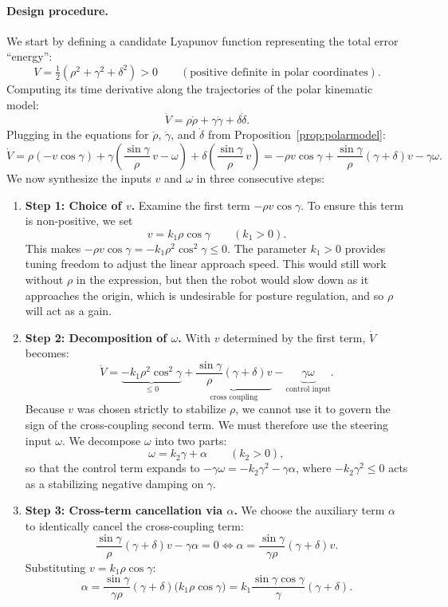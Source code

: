 \documentclass[11pt,a4paper]{article}
\theoremstyle{definition}
\theoremstyle{plain}
\theoremstyle{remark}
\begin{document}
\paragraph{Design procedure.}
We start by defining a candidate Lyapunov function representing the total error ``energy'':
\[
V = \tfrac{1}{2}\left(\rho^2 + \gamma^2 + \delta^2\right) > 0\qquad (\text{positive definite in polar coordinates}).
\]
Computing its time derivative along the trajectories of the polar kinematic model:
\[
\dot V = \rho\dot\rho + \gamma\dot\gamma + \delta\dot\delta .
\]
Plugging in the equations for $\dot\rho$, $\dot\gamma$, and $\dot\delta$ from Proposition~\ref{prop:polarmodel}:
\[
\dot V = \rho(-v\cos\gamma) + \gamma\left(\frac{\sin\gamma}{\rho}\,v - \omega\right) + \delta\left(\frac{\sin\gamma}{\rho}\,v\right)
= -\rho v\cos\gamma + \frac{\sin\gamma}{\rho}(\gamma+\delta)v - \gamma\omega .
\]
We now synthesize the inputs $v$ and $\omega$ in three consecutive steps:
\begin{enumerate}[leftmargin=*]
\item \textbf{Step 1: Choice of $v$.}
Examine the first term $-\rho v\cos\gamma$. To ensure this term is non-positive, we set
\[
v = k_1\rho\cos\gamma\qquad (k_1>0).
\]
This makes $-\rho v\cos\gamma = -k_1\rho^2\cos^2\gamma \le 0$. The parameter $k_1>0$ provides tuning freedom to adjust the linear approach speed. This would still work without $\rho$ in the expression, but then the robot would slow down as it approaches the origin, which is undesirable for posture regulation, and so $\rho$ will act as a gain.

\item \textbf{Step 2: Decomposition of $\omega$.}
With $v$ determined by the first term, $\dot V$ becomes:
\[
\dot V = \underbrace{-k_1\rho^2\cos^2\gamma}_{\le 0} + \underbrace{\frac{\sin\gamma}{\rho}(\gamma+\delta)v}_{\text{cross coupling}} - \underbrace{\gamma\omega}_{\text{control input}} .
\]
Because $v$ was chosen strictly to stabilize $\rho$, we cannot use it to govern the sign of the cross-coupling second term. We must therefore use the steering input $\omega$.
We decompose $\omega$ into two parts:
\[
\omega = k_2\gamma + \alpha\qquad (k_2>0),
\]
so that the control term expands to $-\gamma\omega = -k_2\gamma^2 - \gamma\alpha$, where $-k_2\gamma^2 \le 0$ acts as a stabilizing negative damping on $\gamma$.

\item \textbf{Step 3: Cross-term cancellation via $\alpha$.}
We choose the auxiliary term $\alpha$ to identically cancel the cross-coupling term:
\[
\frac{\sin\gamma}{\rho}(\gamma+\delta)v - \gamma\alpha = 0 \iff \alpha = \frac{\sin\gamma}{\gamma\rho}(\gamma+\delta)v .
\]
Substituting $v = k_1\rho\cos\gamma$:
\[
\alpha = \frac{\sin\gamma}{\gamma\rho}(\gamma+\delta)\bigl(k_1\rho\cos\gamma\bigr) = k_1\frac{\sin\gamma\cos\gamma}{\gamma}(\gamma+\delta).
\]
\end{enumerate}
\end{document}

